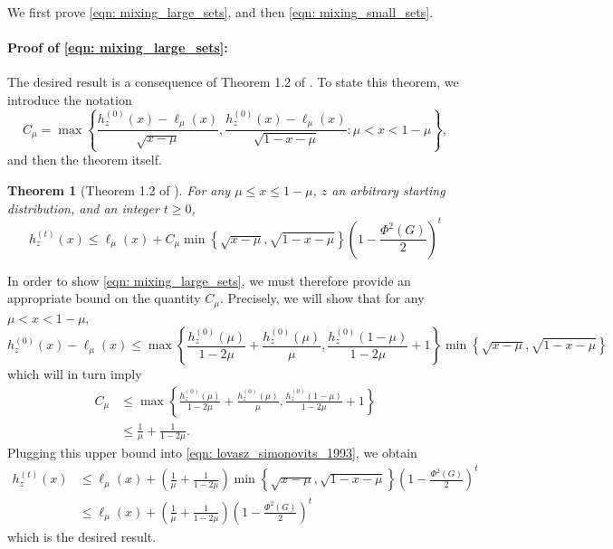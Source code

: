 \documentclass[11pt,twoside]{article}
\newtheorem{theorem}{Theorem}
\newcommand{\set}[1]{\left\{#1\right\}}
\newcommand{\1}{\mathbf{1}}
\begin{document}
We first prove \eqref{eqn: mixing_large_sets}, and then \eqref{eqn: mixing_small_sets}.
\paragraph{Proof of \eqref{eqn: mixing_large_sets}:}
The desired result is a consequence of Theorem 1.2 of \cite{lovasz1990}. To state this theorem, we introduce the notation
\begin{equation*}
C_{\mu} = \max \set{\frac{h_z^{(0)}(x) - \ell_{\mu}(x)}{\sqrt{x - \mu}}, \frac{h_z^{(0)}(x) - \ell_{\mu}(x)}{\sqrt{1 - x - \mu}}: \mu < x < 1 - \mu},
\end{equation*}
and then the theorem itself.
\begin{theorem}[Theorem 1.2 of \cite{lovasz1990}]
	\label{thm: lovasz_simonovits_1993}
	For any $\mu \leq x \leq 1 - \mu$, $z$ an arbitrary starting distribution, and an integer $t \geq 0$,
	\begin{equation}
	\label{eqn: lovasz_simonovits_1993}
	h_z^{(t)}(x) \leq \ell_{\mu}(x) + C_{\mu} \min \set{\sqrt{x - \mu}, \sqrt{1 - x - \mu}} \left(1 - \frac{\Phi^2(G)}{2}\right)^t
	\end{equation}
\end{theorem}
In order to show \eqref{eqn: mixing_large_sets}, we must therefore provide an appropriate bound on the quantity $C_{\mu}$. Precisely, we will show that for any $\mu < x < 1 - \mu$,
\begin{equation}
\label{eqn: lt_ub_1}
h_z^{(0)}(x) - \ell_{\mu}(x) \leq \max \set{\frac{h_z^{(0)}(\mu)}{1 - 2\mu} + \frac{h_z^{(0)}(\mu)}{\mu} , \frac{h_z^{(0)}(1 - \mu) }{1 - 2\mu} + 1 } \min \set{\sqrt{x - \mu},\sqrt{1 - x - \mu}}
\end{equation}
which will in turn imply
\begin{align*}
C_{\mu} & \leq \max \set{\frac{h_z^{(0)}(\mu)}{1 - 2\mu} + \frac{h_z^{(0)}(\mu)}{\mu} , \frac{h_z^{(0)}(1 - \mu) }{1 - 2\mu} + 1 } \\
& \leq \frac{1}{\mu} + \frac{1}{1 - 2\mu}.
\end{align*}
Plugging this upper bound into \eqref{eqn: lovasz_simonovits_1993}, we obtain
\begin{align*}
h_z^{(t)}(x) & \leq \ell_{\mu}(x) +  \left(\frac{1}{\mu} + \frac{1}{1 - 2\mu}\right)\min \set{\sqrt{x - \mu}, \sqrt{1 - x - \mu}} \left(1 - \frac{\Phi^2(G)}{2}\right)^t \\
& \leq \ell_{\mu}(x) +  \left(\frac{1}{\mu} + \frac{1}{1 - 2\mu}\right)\left(1 - \frac{\Phi^2(G)}{2}\right)^t
\end{align*}
which is the desired result.
\end{document}
